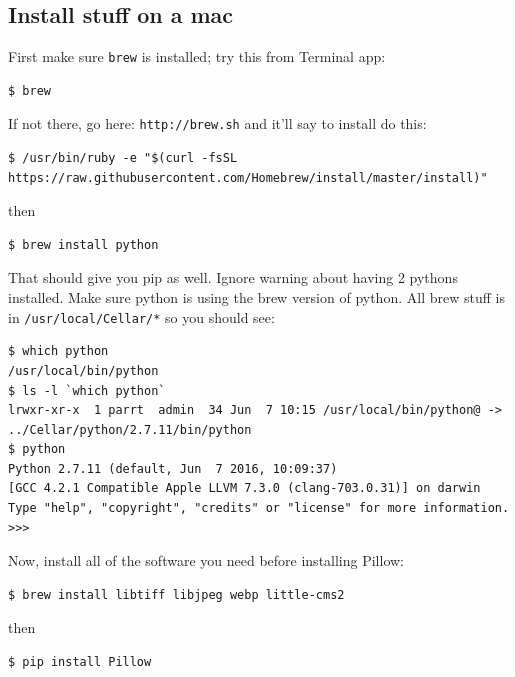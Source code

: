 \documentclass[titlepage]{tufte-book}
\begin{document}
\subsection{Install stuff on a mac}

First make sure {\tt brew} is installed; try this from Terminal app:

\begin{lstlisting}[style=BashInputStyle]
$ brew
\end{lstlisting}

\noindent If not there, go here: {\tt http://brew.sh} and it'll say to install do this:

\begin{lstlisting}[style=BashInputStyle]
$ /usr/bin/ruby -e "$(curl -fsSL https://raw.githubusercontent.com/Homebrew/install/master/install)"
\end{lstlisting}

\noindent then

\begin{lstlisting}[style=BashInputStyle]
$ brew install python
\end{lstlisting}

\noindent That should give you pip as well.  Ignore warning about having 2 pythons installed.  Make sure python is using the brew version of python. All brew stuff is in {\tt /usr/local/Cellar/*} so you should see:

\begin{lstlisting}[style=BashInputStyle]
$ which python
/usr/local/bin/python
$ ls -l `which python`
lrwxr-xr-x  1 parrt  admin  34 Jun  7 10:15 /usr/local/bin/python@ -> ../Cellar/python/2.7.11/bin/python
$ python
Python 2.7.11 (default, Jun  7 2016, 10:09:37) 
[GCC 4.2.1 Compatible Apple LLVM 7.3.0 (clang-703.0.31)] on darwin
Type "help", "copyright", "credits" or "license" for more information.
>>> 
\end{lstlisting}

\noindent Now, install all of the software you need before installing Pillow:

\begin{lstlisting}[style=BashInputStyle]
$ brew install libtiff libjpeg webp little-cms2
\end{lstlisting}

\noindent then

\begin{lstlisting}[style=BashInputStyle]
$ pip install Pillow
\end{lstlisting}
\end{document}
